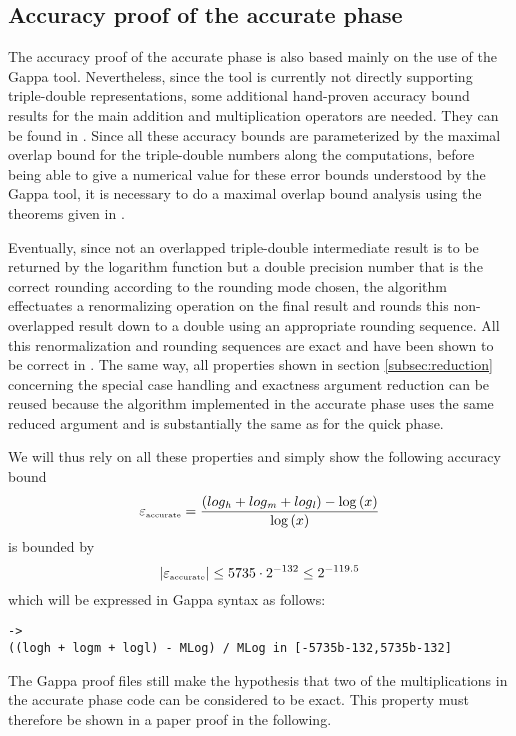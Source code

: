 \subsection{Accuracy proof of the accurate phase\label{subsec:accuratephase}}
The accuracy proof of the accurate phase is also based mainly on the use of the Gappa tool. 
Nevertheless, since the tool is currently not directly supporting triple-double representations, some additional
hand-proven accuracy bound results for the main addition and multiplication operators are needed. They can be
found in \cite{Lau05}. Since all these accuracy bounds are parameterized by the maximal overlap bound
for the triple-double numbers along the computations, before being able to give a numerical value for
these error bounds understood by the Gappa tool, it is necessary to do a maximal overlap bound analysis using
the theorems given in \cite{Lau05}.\par
Eventually, since not an overlapped triple-double intermediate result is to be returned by the logarithm function but a 
double precision number that is the correct rounding according to the rounding mode chosen, the algorithm effectuates
a renormalizing operation on the final result and rounds this non-overlapped result down to a double using an
appropriate rounding sequence. All this renormalization and rounding sequences are exact and have been shown to be
correct in \cite{Lau05}. The same way, all properties shown in section \ref{subsec:reduction} 
concerning the special case handling and exactness argument reduction can be reused because the algorithm implemented in
the accurate phase uses the same reduced argument and is substantially the same as for the quick phase. \par
We will thus rely on all these properties and simply show the following accuracy bound
$$\epsilon_{\mbox{\tiny accurate}} = \frac{\left( log_\hi + log_\mi + log_\lo \right) - \log\left( x \right)}{\log\left( x \right)}$$
is bounded by 
$$\left \vert \epsilon_{\mbox{\tiny accurate}} \right \vert \leq 5735 \cdot 2^{-132} \leq 2^{-119.5}$$
which will be expressed in Gappa syntax as follows:
\begin{lstlisting}[caption={Accuracy bound to prove for the accurate phase},firstnumber=165]
->
((logh + logm + logl) - MLog) / MLog in [-5735b-132,5735b-132]
\end{lstlisting}
The Gappa proof files still make the hypothesis that two of the multiplications in the accurate phase code can be 
considered to be 
exact. This property must therefore be shown in a paper proof in the following. \\
